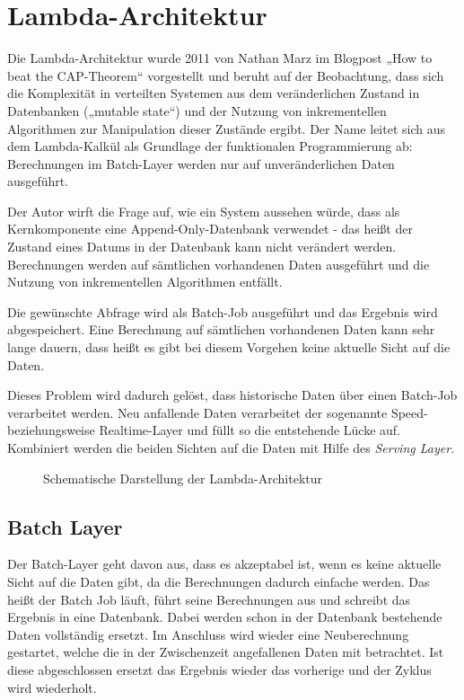 \documentclass[a4paper,11pt]{scrartcl}
\begin{document}
  \section{Lambda-Architektur}
  Die Lambda-Architektur wurde 2011 von Nathan Marz im Blogpost „How to beat
  the CAP-Theorem“\cite{marz2011} vorgestellt und beruht auf der Beobachtung,
  dass sich die Komplexität in verteilten Systemen aus dem veränderlichen
  Zustand in Datenbanken („mutable state“) und der Nutzung von inkrementellen
  Algorithmen zur Manipulation dieser Zustände ergibt.  Der Name leitet sich
  aus dem Lambda-Kalkül als Grundlage der funktionalen Programmierung ab:
  Berechnungen im Batch-Layer werden nur auf unveränderlichen Daten ausgeführt.

  Der Autor wirft die Frage auf, wie ein System aussehen würde, dass als
  Kernkomponente eine Append-Only-Datenbank verwendet - das heißt der Zustand
  eines Datums in der Datenbank kann nicht verändert werden. Berechnungen werden
  auf sämtlichen vorhandenen Daten ausgeführt und die Nutzung von inkrementellen
  Algorithmen entfällt.

  Die gewünschte Abfrage wird als Batch-Job ausgeführt und das Ergebnis wird
  abgespeichert. Eine Berechnung auf sämtlichen vorhandenen Daten kann sehr
  lange dauern, dass heißt es gibt bei diesem Vorgehen keine aktuelle Sicht auf
  die Daten.

  Dieses Problem wird dadurch gelöst, dass historische Daten über einen
  Batch-Job verarbeitet werden. Neu anfallende Daten verarbeitet der sogenannte
  Speed- beziehungsweise  Realtime-Layer und füllt so die entstehende Lücke
  auf. Kombiniert werden die beiden Sichten auf die Daten mit Hilfe des
  \textit{Serving Layer}.

  \begin{figure}[h]
    \center
    \scalebox{.7}{}
    \caption{Schematische Darstellung der Lambda-Architektur}
    \label{fig:lambdaarch}
  \end{figure}

  \subsection{Batch Layer}
  Der Batch-Layer geht davon aus, dass es akzeptabel ist, wenn es keine
  aktuelle Sicht auf die Daten gibt, da die Berechnungen dadurch einfache
  werden.  Das heißt der Batch Job läuft, führt seine Berechnungen aus und
  schreibt das Ergebnis in eine Datenbank. Dabei werden schon in der Datenbank
  bestehende Daten vollständig ersetzt. Im Anschluss wird wieder eine
  Neuberechnung gestartet, welche die in der Zwischenzeit angefallenen Daten
  mit betrachtet. Ist diese abgeschlossen ersetzt das Ergebnis wieder das
  vorherige und der Zyklus wird wiederholt.
\end{document}
